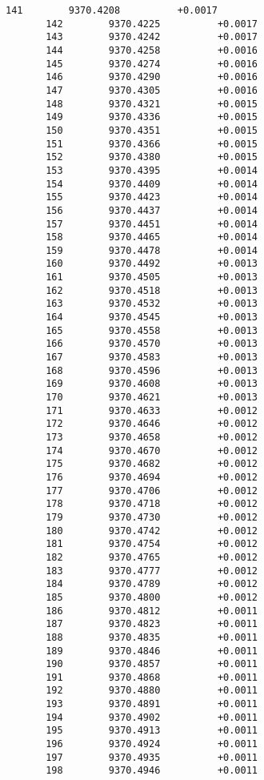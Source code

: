 \documentclass[11pt]{article}
\begin{document}
\begin{Verbatim}[commandchars=\\\{\}]
       141        9370.4208          +0.0017
       142        9370.4225          +0.0017
       143        9370.4242          +0.0017
       144        9370.4258          +0.0016
       145        9370.4274          +0.0016
       146        9370.4290          +0.0016
       147        9370.4305          +0.0016
       148        9370.4321          +0.0015
       149        9370.4336          +0.0015
       150        9370.4351          +0.0015
       151        9370.4366          +0.0015
       152        9370.4380          +0.0015
       153        9370.4395          +0.0014
       154        9370.4409          +0.0014
       155        9370.4423          +0.0014
       156        9370.4437          +0.0014
       157        9370.4451          +0.0014
       158        9370.4465          +0.0014
       159        9370.4478          +0.0014
       160        9370.4492          +0.0013
       161        9370.4505          +0.0013
       162        9370.4518          +0.0013
       163        9370.4532          +0.0013
       164        9370.4545          +0.0013
       165        9370.4558          +0.0013
       166        9370.4570          +0.0013
       167        9370.4583          +0.0013
       168        9370.4596          +0.0013
       169        9370.4608          +0.0013
       170        9370.4621          +0.0013
       171        9370.4633          +0.0012
       172        9370.4646          +0.0012
       173        9370.4658          +0.0012
       174        9370.4670          +0.0012
       175        9370.4682          +0.0012
       176        9370.4694          +0.0012
       177        9370.4706          +0.0012
       178        9370.4718          +0.0012
       179        9370.4730          +0.0012
       180        9370.4742          +0.0012
       181        9370.4754          +0.0012
       182        9370.4765          +0.0012
       183        9370.4777          +0.0012
       184        9370.4789          +0.0012
       185        9370.4800          +0.0012
       186        9370.4812          +0.0011
       187        9370.4823          +0.0011
       188        9370.4835          +0.0011
       189        9370.4846          +0.0011
       190        9370.4857          +0.0011
       191        9370.4868          +0.0011
       192        9370.4880          +0.0011
       193        9370.4891          +0.0011
       194        9370.4902          +0.0011
       195        9370.4913          +0.0011
       196        9370.4924          +0.0011
       197        9370.4935          +0.0011
       198        9370.4946          +0.0011

\end{Verbatim}
\end{document}
